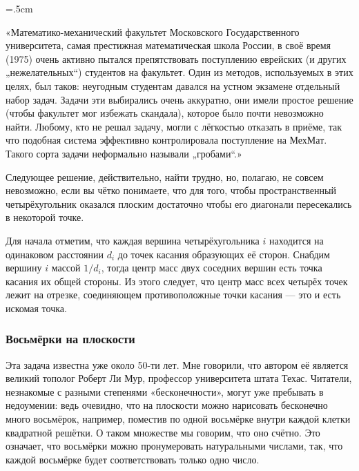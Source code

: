 \medskip

\begin{trivlist}\leftskip=1cm\rightskip=.5cm
\item\relax«Математико-механический факультет Московского Государственного университета, самая престижная математическая школа России, в своё время (1975) очень активно пытался препятствовать поступлению еврейских (и других „нежелательных“) студентов на факультет.
Один из методов, используемых в этих целях, был таков: неугодным студентам давался на устном экзамене отдельный набор задач.
Задачи эти выбирались очень аккуратно, они имели простое решение (чтобы факультет мог избежать скандала), которое было почти невозможно найти.
Любому, кто не решал задачу, могли с лёгкостью отказать в приёме, так что подобная система эффективно контролировала поступление на МехМат.
Такого сорта задачи неформально называли „гробами“.» %
\end{trivlist}

\medskip

Следующее решение, действительно, найти трудно, но, полагаю, не совсем невозможно, если вы чётко понимаете, что для того, чтобы пространственный четырёхугольник оказался плоским достаточно чтобы его диагонали пересекались в некоторой точке.

Для начала отметим, что каждая вершина четырёхугольника $i$ находится на одинаковом расстоянии $d_i$ до точек касания образующих её сторон.
Снабдим вершину $i$ массой $1/d_i$, тогда центр масс двух соседних вершин есть точка касания их общей стороны.
Из этого следует, что центр масс всех четырёх точек лежит на отрезке, соединяющем противоположные точки касания --- это и есть искомая точка.
\heart

\subsubsection*{Восьмёрки на плоскости}%

Эта задача известна уже около 50-ти лет.
Мне говорили, что автором её является великий тополог Роберт Ли Мур, профессор университета штата Техас. %
Читатели, незнакомые с разными степенями «бесконечности», могут уже пребывать в недоумении: ведь очевидно, что на плоскости можно нарисовать бесконечно много восьмёрок, например, поместив по одной восьмёрке внутри каждой клетки квадратной решётки.
О таком множестве мы говорим, что оно счётно. 
Это означает, что восьмёрки можно пронумеровать натуральными числами, так, что каждой восьмёрке будет соответствовать только одно число.

